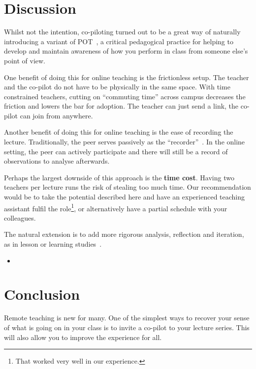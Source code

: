 \documentclass[sigconf]{acmart}
\begin{document}
\section{Discussion}

Whilst not the intention, co-piloting turned out to be a great way of naturally 
introducing a variant of 
\ac{POT}~\cite[\cf][]{PeerObservation,ReflectivePeerObservation},
a critical 
pedagogical practice for helping to develop and maintain awareness of how you 
perform in class from someone else's point of view.

One benefit of doing this for online teaching is the frictionless setup. The 
teacher and the co-pilot do not have to be physically in the same space.
With time constrained teachers, cutting on \enquote{commuting time} across 
campus decreases the friction and lowers the bar for adoption.
The teacher can just send a link, the co-pilot can join from anywhere.

Another benefit of doing this for online teaching is the ease of recording the 
lecture.
Traditionally, the peer serves passively as the 
\enquote{recorder}~\cite{PeerObservation,ReflectivePeerObservation}.
In the online setting, the peer can actively participate and there will still 
be a record of observations to analyse afterwards.

Perhaps the largest downside of this approach is the \textbf{time cost}. Having 
two teachers per lecture runs the risk of stealing too much time. Our 
recommendation would be to take the potential described here and have an 
experienced teaching assistant fulfil the role\footnote{%
  That worked very well in our experience.
}, or alternatively have a partial schedule
with your colleagues.

The natural extension is to add more rigorous analysis, reflection and 
iteration, as in lesson or learning 
studies~\cite{NecessaryConditionsOfLearning}.

\begin{itemize}
    \item 
\end{itemize}

\section*{Conclusion}

Remote teaching is new for many.
One of the simplest ways to recover your sense of what is going on in your class is to invite a co-pilot to your lecture series.
This will also allow you to improve the experience for all.



\end{document}
